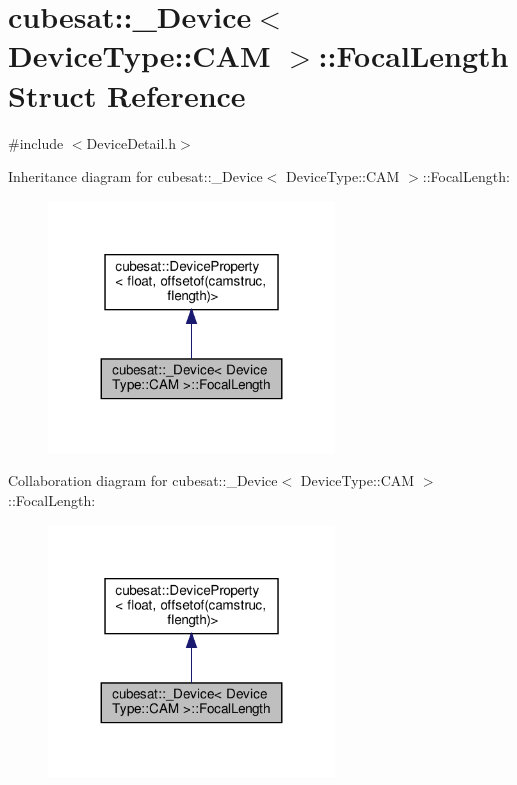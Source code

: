 \hypertarget{structcubesat_1_1__Device_3_01DeviceType_1_1CAM_01_4_1_1FocalLength}{}\section{cubesat\+:\+:\+\_\+\+Device$<$ Device\+Type\+:\+:C\+AM $>$\+:\+:Focal\+Length Struct Reference}
\label{structcubesat_1_1__Device_3_01DeviceType_1_1CAM_01_4_1_1FocalLength}


{\ttfamily \#include $<$Device\+Detail.\+h$>$}



Inheritance diagram for cubesat\+:\+:\+\_\+\+Device$<$ Device\+Type\+:\+:C\+AM $>$\+:\+:Focal\+Length\+:\nopagebreak
\begin{figure}[H]
\begin{center}
\leavevmode
\includegraphics[width=215pt]{structcubesat_1_1__Device_3_01DeviceType_1_1CAM_01_4_1_1FocalLength__inherit__graph}
\end{center}
\end{figure}


Collaboration diagram for cubesat\+:\+:\+\_\+\+Device$<$ Device\+Type\+:\+:C\+AM $>$\+:\+:Focal\+Length\+:\nopagebreak
\begin{figure}[H]
\begin{center}
\leavevmode
\includegraphics[width=215pt]{structcubesat_1_1__Device_3_01DeviceType_1_1CAM_01_4_1_1FocalLength__coll__graph}
\end{center}
\end{figure}
